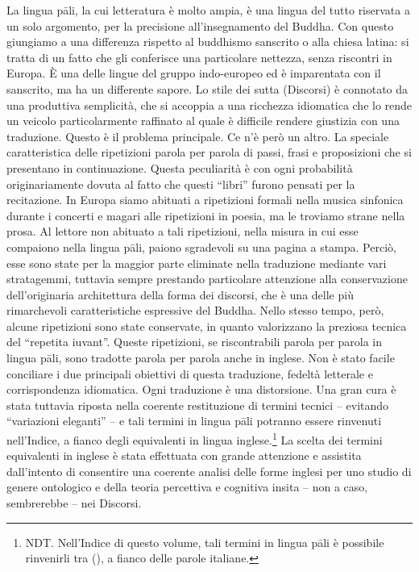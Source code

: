 La lingua pāli, la cui letteratura è molto ampia, è una lingua del tutto
riservata a un solo argomento, per la precisione all’insegnamento del
Buddha. Con questo giungiamo a una differenza rispetto al buddhismo
sanscrito o alla chiesa latina: si tratta di un fatto che gli conferisce
una particolare nettezza, senza riscontri in Europa. È una delle lingue
del gruppo indo-europeo ed è imparentata con il sanscrito, ma ha un
differente sapore. Lo stile dei sutta (Discorsi) è connotato da una
produttiva semplicità, che si accoppia a una ricchezza idiomatica che lo
rende un veicolo particolarmente raffinato al quale è difficile rendere
giustizia con una traduzione. Questo è il problema principale. Ce n’è
però un altro. La speciale caratteristica delle ripetizioni parola per
parola di passi, frasi e proposizioni che si presentano in
continuazione. Questa peculiarità è con ogni probabilità originariamente
dovuta al fatto che questi “libri” furono pensati per la recitazione. In
Europa siamo abituati a ripetizioni formali nella musica sinfonica
durante i concerti e magari alle ripetizioni in poesia, ma le troviamo
strane nella prosa. Al lettore non abituato a tali ripetizioni, nella
misura in cui esse compaiono nella lingua pāli, paiono sgradevoli su una
pagina a stampa. Perciò, esse sono state per la maggior parte eliminate
nella traduzione mediante vari stratagemmi, tuttavia sempre prestando
particolare attenzione alla conservazione dell’originaria architettura
della forma dei discorsi, che è una delle più rimarchevoli
caratteristiche espressive del Buddha. Nello stesso tempo, però, alcune
ripetizioni sono state conservate, in quanto valorizzano la preziosa
tecnica del “repetita iuvant”. Queste ripetizioni, se riscontrabili
parola per parola in lingua pāli, sono tradotte parola per parola anche
in inglese. Non è stato facile conciliare i due principali obiettivi di
questa traduzione, fedeltà letterale e corrispondenza idiomatica. Ogni
traduzione è una distorsione. Una gran cura è stata tuttavia riposta
nella coerente restituzione di termini tecnici – evitando “variazioni
eleganti” – e tali termini in lingua pāli potranno essere rinvenuti
nell’Indice, a fianco degli equivalenti in lingua
inglese.\footnote{NDT. Nell’Indice di questo volume, tali termini in lingua pāli è possibile rinvenirli tra (), a fianco delle parole italiane.}
La scelta dei termini equivalenti in inglese
è stata effettuata con grande attenzione e assistita dall’intento di
consentire una coerente analisi delle forme inglesi per uno studio di
genere ontologico e della teoria percettiva e cognitiva insita – non a
caso, sembrerebbe – nei Discorsi.

